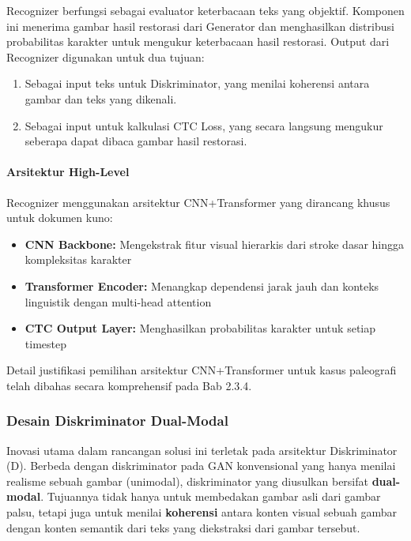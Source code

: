 \documentclass[12pt,a4paper]{article}
\begin{document}
Recognizer berfungsi sebagai evaluator keterbacaan teks yang objektif. Komponen ini menerima gambar hasil restorasi dari Generator dan menghasilkan distribusi probabilitas karakter untuk mengukur keterbacaan hasil restorasi. Output dari Recognizer digunakan untuk dua tujuan:

\begin{enumerate}[nosep]
    \item Sebagai input teks untuk Diskriminator, yang menilai koherensi antara gambar dan teks yang dikenali.
    \item Sebagai input untuk kalkulasi CTC Loss, yang secara langsung mengukur seberapa dapat dibaca gambar hasil restorasi.
\end{enumerate}

\paragraph{Arsitektur High-Level}

Recognizer menggunakan arsitektur CNN+Transformer yang dirancang khusus untuk dokumen kuno:

\begin{itemize}
    \item \textbf{CNN Backbone:} Mengekstrak fitur visual hierarkis dari stroke dasar hingga kompleksitas karakter
    \item \textbf{Transformer Encoder:} Menangkap dependensi jarak jauh dan konteks linguistik dengan multi-head attention
    \item \textbf{CTC Output Layer:} Menghasilkan probabilitas karakter untuk setiap timestep
\end{itemize}

Detail justifikasi pemilihan arsitektur CNN+Transformer untuk kasus paleografi telah dibahas secara komprehensif pada Bab 2.3.4.

\subsubsection{Desain Diskriminator Dual-Modal} %

Inovasi utama dalam rancangan solusi ini terletak pada arsitektur Diskriminator (D). Berbeda dengan diskriminator pada GAN konvensional yang hanya menilai realisme sebuah gambar (unimodal), diskriminator yang diusulkan bersifat \textbf{dual-modal}. Tujuannya tidak hanya untuk membedakan gambar asli dari gambar palsu, tetapi juga untuk menilai \textbf{koherensi} antara konten visual sebuah gambar dengan konten semantik dari teks yang diekstraksi dari gambar tersebut.
\end{document}
